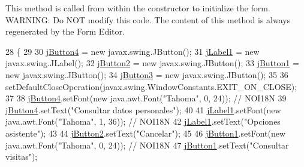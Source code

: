 This method is called from within the constructor to initialize the form. W\+A\+R\+N\+I\+NG\+: Do N\+OT modify this code. The content of this method is always regenerated by the Form Editor. 
\begin{DoxyCode}
28                                   \{
29 
30         \mbox{\hyperlink{classinterfacessoguar_1_1elegirasistente_a5b4ead7537cc84f35f56c57ca95f3217}{jButton4}} = \textcolor{keyword}{new} javax.swing.JButton();
31         \mbox{\hyperlink{classinterfacessoguar_1_1elegirasistente_af27c9b11cea62f6c96b7ebb47653e9de}{jLabel1}} = \textcolor{keyword}{new} javax.swing.JLabel();
32         \mbox{\hyperlink{classinterfacessoguar_1_1elegirasistente_a6522f7eb0d070434d11b803b11bcd34b}{jButton2}} = \textcolor{keyword}{new} javax.swing.JButton();
33         \mbox{\hyperlink{classinterfacessoguar_1_1elegirasistente_a07a589d7d398109bec67c508df5c7ecd}{jButton1}} = \textcolor{keyword}{new} javax.swing.JButton();
34         \mbox{\hyperlink{classinterfacessoguar_1_1elegirasistente_a856391f7b77755ef9c4272b75d0e7d08}{jButton3}} = \textcolor{keyword}{new} javax.swing.JButton();
35 
36         setDefaultCloseOperation(javax.swing.WindowConstants.EXIT\_ON\_CLOSE);
37 
38         \mbox{\hyperlink{classinterfacessoguar_1_1elegirasistente_a5b4ead7537cc84f35f56c57ca95f3217}{jButton4}}.setFont(\textcolor{keyword}{new} java.awt.Font(\textcolor{stringliteral}{"Tahoma"}, 0, 24)); \textcolor{comment}{// NOI18N}
39         \mbox{\hyperlink{classinterfacessoguar_1_1elegirasistente_a5b4ead7537cc84f35f56c57ca95f3217}{jButton4}}.setText(\textcolor{stringliteral}{"Consultar datos personales"});
40 
41         \mbox{\hyperlink{classinterfacessoguar_1_1elegirasistente_af27c9b11cea62f6c96b7ebb47653e9de}{jLabel1}}.setFont(\textcolor{keyword}{new} java.awt.Font(\textcolor{stringliteral}{"Tahoma"}, 1, 36)); \textcolor{comment}{// NOI18N}
42         \mbox{\hyperlink{classinterfacessoguar_1_1elegirasistente_af27c9b11cea62f6c96b7ebb47653e9de}{jLabel1}}.setText(\textcolor{stringliteral}{"Opciones asistente"});
43 
44         \mbox{\hyperlink{classinterfacessoguar_1_1elegirasistente_a6522f7eb0d070434d11b803b11bcd34b}{jButton2}}.setText(\textcolor{stringliteral}{"Cancelar"});
45 
46         \mbox{\hyperlink{classinterfacessoguar_1_1elegirasistente_a07a589d7d398109bec67c508df5c7ecd}{jButton1}}.setFont(\textcolor{keyword}{new} java.awt.Font(\textcolor{stringliteral}{"Tahoma"}, 0, 24)); \textcolor{comment}{// NOI18N}
47         \mbox{\hyperlink{classinterfacessoguar_1_1elegirasistente_a07a589d7d398109bec67c508df5c7ecd}{jButton1}}.setText(\textcolor{stringliteral}{"Consultar visitas"});

\end{DoxyCode}
